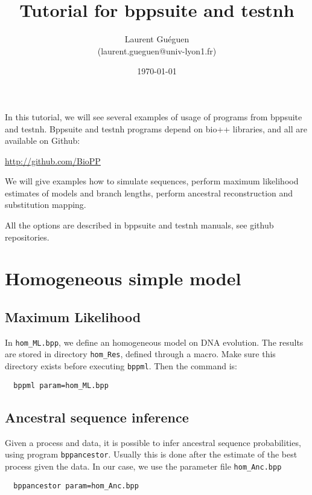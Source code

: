 \documentclass{article}
\title{Tutorial for bppsuite and testnh}
\date{\today}
\author{Laurent Guéguen \\ {\small (laurent.gueguen@univ-lyon1.fr)}}
\begin{document}
\maketitle
\thispagestyle{empty}

\medskip 


In this tutorial, we will see several examples of usage of programs
from bppsuite and testnh. Bppsuite and testnh programs depend on bio++
libraries, and all are available on Github:

\url{http://github.com/BioPP}

\medskip

We will give examples how to simulate sequences, perform maximum
likelihood estimates of models and branch lengths, perform ancestral
reconstruction and substitution mapping.

All the options are described in bppsuite and testnh manuals, see
github repositories. 


\section{Homogeneous simple model}

\subsection*{Maximum Likelihood}

In \texttt{hom\_ML.bpp}, we define an homogeneous model on DNA evolution.
The results are stored in directory \texttt{hom\_Res}, defined through
a macro. Make sure this directory exists before executing
\texttt{bppml}. Then the command is:

\begin{verbatim}
  bppml param=hom_ML.bpp
\end{verbatim}

\subsection*{Ancestral sequence inference}

Given a process and data, it is possible to infer ancestral sequence
probabilities, using program \texttt{bppancestor}. Usually this is
done after the estimate of the best process given the data. In our
case, we use the parameter file \texttt{hom\_Anc.bpp}

\begin{verbatim}
  bppancestor param=hom_Anc.bpp
\end{verbatim}
\end{document}
